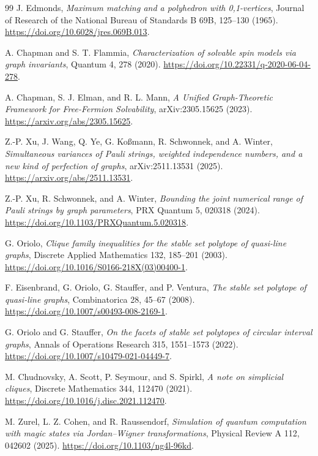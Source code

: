 \documentclass[11pt,a4paper]{article}
\theoremstyle{remark}
\begin{document}
\begin{thebibliography}{99}
\small
{}
J. Edmonds, \emph{Maximum matching and a polyhedron with 0,1-vertices},
Journal of Research of the National Bureau of Standards B 69B, 125--130
(1965). \url{https://doi.org/10.6028/jres.069B.013}.

A. Chapman and S. T. Flammia,
\emph{Characterization of solvable spin models via graph invariants},
Quantum 4, 278 (2020).
\url{https://doi.org/10.22331/q-2020-06-04-278}.

A. Chapman, S. J. Elman, and R. L. Mann,
\emph{A Unified Graph-Theoretic Framework for Free-Fermion Solvability},
arXiv:2305.15625 (2023).
\url{https://arxiv.org/abs/2305.15625}.

Z.-P. Xu, J. Wang, Q. Ye, G. Ko\ss mann, R. Schwonnek, and A. Winter,
\emph{Simultaneous variances of Pauli strings, weighted independence numbers,
and a new kind of perfection of graphs}, arXiv:2511.13531 (2025).
\url{https://arxiv.org/abs/2511.13531}.

Z.-P. Xu, R. Schwonnek, and A. Winter,
\emph{Bounding the joint numerical range of Pauli strings by graph
parameters}, PRX Quantum 5, 020318 (2024).
\url{https://doi.org/10.1103/PRXQuantum.5.020318}.

G. Oriolo, \emph{Clique family inequalities for the stable set polytope of
quasi-line graphs}, Discrete Applied Mathematics 132, 185--201 (2003).
\url{https://doi.org/10.1016/S0166-218X(03)00400-1}.

F. Eisenbrand, G. Oriolo, G. Stauffer, and P. Ventura,
\emph{The stable set polytope of quasi-line graphs}, Combinatorica 28,
45--67 (2008). \url{https://doi.org/10.1007/s00493-008-2169-1}.

G. Oriolo and G. Stauffer,
\emph{On the facets of stable set polytopes of circular interval graphs},
Annals of Operations Research 315, 1551--1573 (2022).
\url{https://doi.org/10.1007/s10479-021-04449-7}.

M. Chudnovsky, A. Scott, P. Seymour, and S. Spirkl,
\emph{A note on simplicial cliques},
Discrete Mathematics 344, 112470 (2021).
\url{https://doi.org/10.1016/j.disc.2021.112470}.

M. Zurel, L. Z. Cohen, and R. Raussendorf,
\emph{Simulation of quantum computation with magic states via Jordan--Wigner
transformations}, Physical Review A 112, 042602 (2025).
\url{https://doi.org/10.1103/ng4l-96kd}.


\end{thebibliography}
\end{document}
